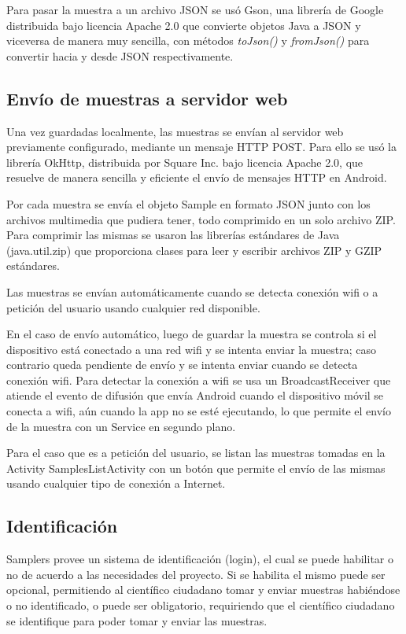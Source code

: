 Para pasar la muestra a un archivo JSON se usó Gson\cite{gson}, una librería de Google distribuida bajo licencia Apache 2.0 que convierte objetos Java a JSON y viceversa de manera muy sencilla, con métodos \textit{toJson()} y \textit{fromJson()} para convertir hacia y desde JSON respectivamente.

\subsection{Envío de muestras a servidor web}\label{sec:envio_muestras}

Una vez guardadas localmente, las muestras se envían al servidor web previamente configurado, mediante un mensaje HTTP POST. Para ello se usó la librería OkHttp\cite{okhttp}, distribuida por Square Inc. bajo licencia Apache 2.0, que resuelve de manera sencilla y eficiente el envío de mensajes HTTP en Android.

Por cada muestra se envía el objeto Sample en formato JSON junto con los archivos multimedia que pudiera tener, todo comprimido en un solo archivo ZIP. Para comprimir las mismas se usaron las librerías estándares de Java (java.util.zip) que proporciona clases para leer y escribir archivos ZIP y GZIP estándares.

Las muestras se envían automáticamente cuando se detecta conexión wifi o a petición del usuario usando cualquier red disponible.

En el caso de envío automático, luego de guardar la muestra se controla si el dispositivo está conectado a una red wifi y se intenta enviar la muestra; caso contrario queda pendiente de envío y se intenta enviar cuando se detecta conexión wifi. Para detectar la conexión a wifi se usa un BroadcastReceiver que atiende el evento de difusión que envía Android cuando el dispositivo móvil se conecta a wifi, aún cuando la app no se esté ejecutando, lo que permite el envío de la muestra con un Service en segundo plano.

Para el caso que es a petición del usuario, se listan las muestras tomadas en la Activity SamplesListActivity con un botón que permite el envío de las mismas usando cualquier tipo de conexión a Internet.

\subsection{Identificación}
Samplers provee un sistema de identificación (login), el cual se puede habilitar o no de acuerdo a las necesidades del proyecto. Si se habilita el mismo puede ser opcional, permitiendo al científico ciudadano tomar y enviar muestras habiéndose o no identificado, o puede ser obligatorio, requiriendo que el científico ciudadano se identifique para poder tomar y enviar las muestras.

